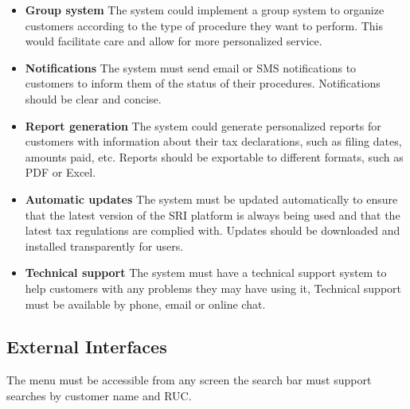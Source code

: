 \documentclass[12pt,a4paper, twosite]{article}
\begin{document}
\begin{itemize}
\item
\textbf {Group system}
The system could implement a group system to organize customers according to the type of procedure they want to perform. 
This would facilitate care and allow for more personalized service. 
\end{itemize}

\begin{itemize}
\item
\textbf {Notifications}
The system must send email or SMS notifications to customers to inform them of the status of their procedures. 
Notifications should be clear and concise. 
\end{itemize}

\begin{itemize}
\item
\textbf {Report generation}
The system could generate personalized reports for customers with information about their tax declarations, such as filing dates, amounts paid, etc. 
Reports should be exportable to different formats, such as PDF or Excel. 
\end{itemize}

\begin{itemize}
\item
\textbf {Automatic updates}
The system must be updated automatically to ensure that the latest version of the SRI platform is always being used and that the latest tax regulations are complied with. 
Updates should be downloaded and installed transparently for users. 
\end{itemize}

\begin{itemize}
\item
\textbf {Technical support}
The system must have a technical support system to help customers with any problems they may have using it,
Technical support must be available by phone, email or online chat. 
\end{itemize}






\subsection{External Interfaces}
\label{sec:orgfd5391f}

The menu must be accessible from any screen the search bar must support searches by customer name and RUC.\\
\end{document}
